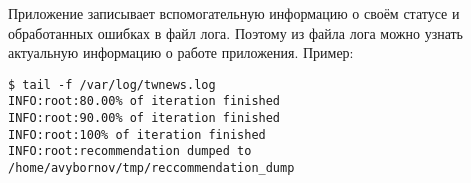         Приложение записывает вспомогательную информацию о своём статусе и обработанных ошибках в файл лога.
        Поэтому из файла лога можно узнать актуальную информацию о работе приложения. Пример:
        \begin{lstlisting}
$ tail -f /var/log/twnews.log
INFO:root:80.00% of iteration finished
INFO:root:90.00% of iteration finished
INFO:root:100% of iteration finished
INFO:root:recommendation dumped to /home/avybornov/tmp/reccommendation_dump
        \end{lstlisting}